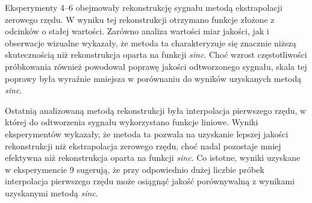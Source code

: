 \documentclass{article}
\begin{document}
    Eksperymenty 4–6 obejmowały rekonstrukcję sygnału metodą ekstrapolacji zerowego rzędu. 
    W wyniku tej rekonstrukcji otrzymano funkcje złożone z odcinków o stałej wartości. 
    Zarówno analiza wartości miar jakości, jak i obserwacje wizualne wykazały, że metoda ta 
    charakteryzuje się znacznie niższą skutecznością niż rekonstrukcja oparta na funkcji \emph{sinc}.
    Choć wzrost częstotliwości próbkowania również powodował poprawę jakości odtworzonego sygnału, 
    skala tej poprawy była wyraźnie mniejsza w porównaniu do wyników uzyskanych metodą \emph{sinc}.

    Ostatnią analizowaną metodą rekonstrukcji była interpolacja pierwszego rzędu, w której do odtworzenia 
    sygnału wykorzystano funkcje liniowe. Wyniki eksperymentów wykazały, że metoda ta pozwala na uzyskanie 
    lepszej jakości rekonstrukcji niż ekstrapolacja zerowego rzędu, choć nadal pozostaje mniej efektywna niż 
    rekonstrukcja oparta na funkcji \emph{sinc}. Co istotne, wyniki uzyskane w eksperymencie 9 sugerują, że 
    przy odpowiednio dużej liczbie próbek interpolacja pierwszego rzędu może osiągnąć jakość porównywalną z 
    wynikami uzyskanymi metodą \emph{sinc}.
    
\end{document}
